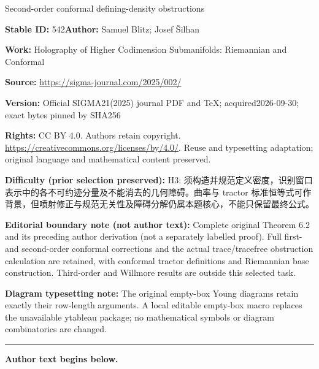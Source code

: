 \documentclass[11pt]{article}
\numberwithin{equation}{section}
\renewcommand{\=}{\stackrel \Lambda =}
\begin{document}
\begin{center}\Large Second-order conformal defining-density obstructions\end{center}
\noindent\textbf{Stable ID:} 542\quad\textbf{Author:} Samuel Blitz; Josef Šilhan\par
\noindent\textbf{Work:} Holography of Higher Codimension Submanifolds: Riemannian and Conformal\par
\noindent\textbf{Source:} \url{https://sigma-journal.com/2025/002/}\par
\noindent\textbf{Version:} Official SIGMA21(2025) journal PDF and TeX; acquired2026-09-30; exact bytes pinned by SHA256\par
\noindent\textbf{Rights:} CC BY 4.0. Authors retain copyright. \url{https://creativecommons.org/licenses/by/4.0/}. Reuse and typesetting adaptation; original language and mathematical content preserved.\par
\noindent\textbf{Difficulty (prior selection preserved):} {\CJKfont H3: 须构造并规范定义密度，识别窗口表示中的各不可约迹分量及不能消去的几何障碍。曲率与 tractor 标准恒等式可作背景，但喷射修正与规范无关性及障碍分解仍属本题核心，不能只保留最终公式。}\par
\medskip\noindent\textbf{Editorial boundary note (not author text):} Complete original Theorem 6.2 and its preceding author derivation (not a separately labelled proof). Full first- and second-order conformal corrections and the actual trace/tracefree obstruction calculation are retained, with conformal tractor definitions and Riemannian base construction. Third-order and Willmore results are outside this selected task.\par
\noindent\textbf{Diagram typesetting note:} The original empty-box Young diagrams retain exactly their row-length arguments. A local editable empty-box macro replaces the unavailable ytableau package; no mathematical symbols or diagram combinatorics are changed.\par
\medskip\hrule\medskip\noindent\textbf{Author text begins below.}\par
\setcounter{section}{1}\setcounter{subsection}{0}
\end{document}
